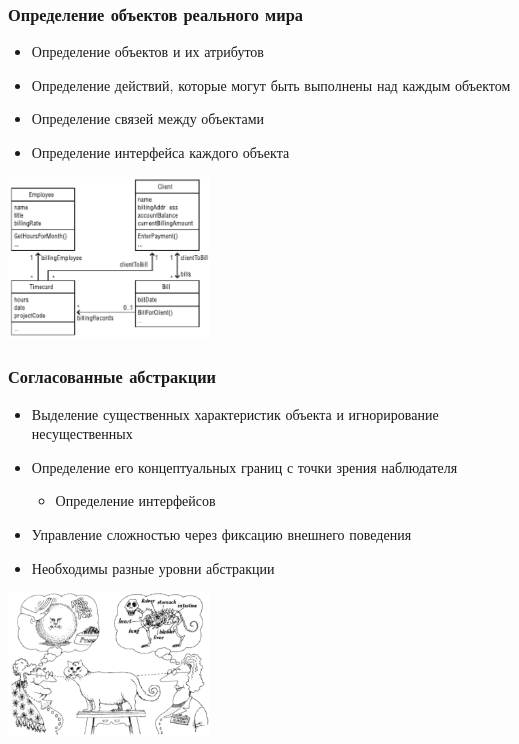 \documentclass{../../slides-style}
\begin{document}
    \begin{frame}
        \frametitle{Определение объектов реального мира}
        \begin{itemize}
            \item Определение объектов и их атрибутов
            \item Определение действий, которые могут быть выполнены над каждым объектом
            \item Определение связей между объектами
            \item Определение интерфейса каждого объекта
        \end{itemize}
        \begin{center}
            \includegraphics[width=0.4\textwidth]{billDomainModel.png}
        \end{center}
    \end{frame}

    \begin{frame}
        \frametitle{Согласованные абстракции}
        \begin{itemize}
            \item Выделение существенных характеристик объекта и игнорирование несущественных
            \item Определение его концептуальных границ с точки зрения наблюдателя
            \begin{itemize}
                \item Определение интерфейсов
            \end{itemize}
            \item Управление сложностью через фиксацию внешнего поведения
            \item Необходимы разные уровни абстракции
        \end{itemize}
        \begin{center}
            \includegraphics[width=0.4\textwidth]{abstraction.png}
        \end{center}
    \end{frame}
\end{document}
